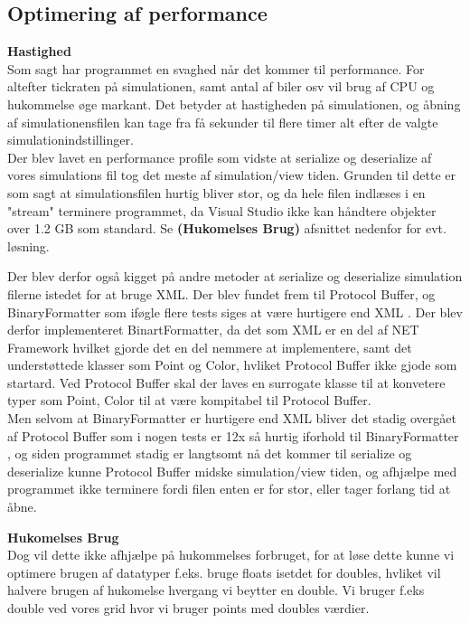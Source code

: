 \subsection*{Optimering af performance}\label{OptimeringAfPerformance}

\textbf{Hastighed} \\
Som sagt har programmet en svaghed når det kommer til performance. For altefter tickraten på simulationen, samt antal af biler osv vil brug af CPU og hukommelse øge markant. Det betyder at hastigheden på simulationen, og åbning af simulationensfilen kan tage fra få sekunder til flere timer alt efter de valgte simulationindstillinger. \\
Der blev lavet en performance profile som vidste at serialize og deserialize af vores simulations fil tog det meste af simulation/view tiden. Grunden til dette er som sagt at simulationsfilen hurtig bliver stor, og da hele filen indlæses i en "stream" terminere programmet, da Visual Studio ikke kan håndtere objekter over 1.2 GB som standard. Se \textbf{(Hukomelses Brug)} afsnittet nedenfor for evt. løsning.

\vspace{5mm}

Der blev derfor også kigget på andre metoder at serialize og deserialize simulation filerne istedet for at bruge XML. Der blev fundet frem til Protocol Buffer, og BinaryFormatter som iføgle flere tests siges at være hurtigere end XML \cite{SerializationPerformance}\cite{ComparingThePerformance}\cite{PerformanceTest}. Der blev derfor implementeret BinartFormatter, da det som XML er en del af NET Framework hvilket gjorde det en del nemmere at implementere, samt det understøttede klasser som Point og Color, hvliket Protocol Buffer ikke gjode som startard. Ved Protocol Buffer skal der laves en surrogate klasse til at konvetere typer som Point, Color til at være kompitabel til Protocol Buffer. \\
Men selvom at BinaryFormatter er hurtigere end XML bliver det stadig overgået af Protocol Buffer som i nogen tests er 12x så hurtig iforhold til BinaryFormatter \cite{PerformanceTest}\cite{Protobuf}, og siden programmet stadig er langtsomt nå det kommer til serialize og deserialize kunne Protocol Buffer midske simulation/view tiden, og afhjælpe med programmet ikke terminere fordi filen enten er for stor, eller tager forlang tid at åbne.

\vspace{5mm}

\textbf{Hukomelses Brug} \\
Dog vil dette ikke afhjælpe på hukommelses forbruget, for at løse dette kunne vi optimere brugen af datatyper f.eks. bruge floats isetdet for doubles, hvliket vil halvere brugen af hukomelse hvergang vi beytter en double. Vi bruger f.eks double ved vores grid hvor vi bruger points med doubles værdier. \\

